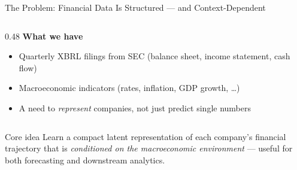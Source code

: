 \documentclass[aspectratio=169]{beamer}
\begin{document}
\begin{frame}{The Problem: Financial Data Is Structured — and Context-Dependent}

  \begin{columns}[T]
    \begin{column}{0.48\textwidth}
      \textbf{What we have}
      \begin{itemize}
        \item Quarterly XBRL filings from SEC (balance sheet, income statement, cash flow)
        \item Macroeconomic indicators (rates, inflation, GDP growth, \ldots)
        \item A need to \emph{represent} companies, not just predict single numbers
      \end{itemize}
    \end{column}
  \end{columns}

  \vspace{1em}
  \begin{block}{Core idea}
    Learn a compact latent representation of each company's financial trajectory
    that is \emph{conditioned on the macroeconomic environment} — useful for
    both forecasting and downstream analytics.
  \end{block}

\end{frame}
\end{document}
